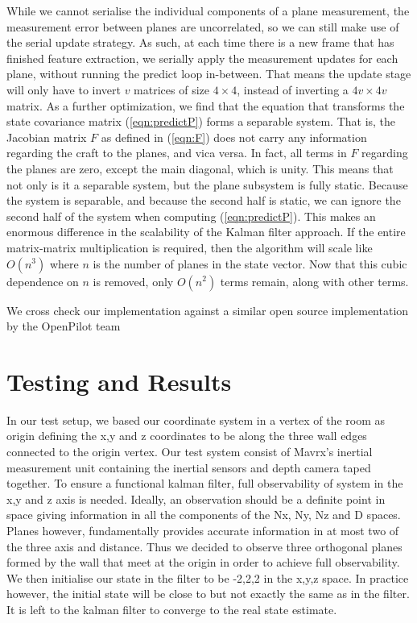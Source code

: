 \documentclass[]{article}
\begin{document}
{While we cannot serialise the individual components of a plane measurement, the measurement error between planes are uncorrelated, so we can still make use of the serial update strategy. As such, at each time there is a new frame that has finished feature extraction, we serially apply the measurement updates for each plane, without running the predict loop in-between.
That means the update stage will only have to invert $v$ matrices of size $4\times4$, instead of inverting a $4v \times 4v$ matrix. 
As a further optimization, we find that the equation that transforms the state covariance matrix (\ref{eqn:predictP}) forms a separable system. That is, the Jacobian matrix $F$ as defined in (\ref{eqn:F}) does not carry any information regarding the craft to the planes, and vica versa.
In fact, all terms in $F$ regarding the planes are zero, except the main diagonal, which is unity. This means that not only is it a separable system, but the plane subsystem is fully static.
Because the system is separable, and because the second half is static, we can ignore the second half of the system when computing (\ref{eqn:predictP}).
This makes an enormous difference in the scalability of the Kalman filter approach. If the entire matrix-matrix multiplication is required, then the algorithm will scale like $O(n^3)$ where $n$ is the number of planes in the state vector. Now that this cubic dependence on $n$ is removed, only $O(n^2)$ terms remain, along with other terms.

	We cross check our implementation against a similar open source implementation by the OpenPilot team %



\section{Testing and Results} %
\label{sub:testing_kalman}
In our test setup, we based our coordinate system in a vertex of the room as origin defining the x,y and z coordinates to be along the three wall edges connected to the origin vertex. Our test system consist of Mavrx's inertial measurement unit containing the inertial sensors and depth camera taped together. To ensure a functional kalman filter, full observability of system in the x,y and z axis is needed. Ideally, an observation should be a definite point in space giving information in all the components of the Nx, Ny, Nz and D spaces. Planes however, fundamentally provides accurate information in at most two of the three axis and distance.  Thus we decided to observe three orthogonal planes formed by the wall that meet at the origin in order to achieve full observability. We then initialise our state in the filter to be -2,2,2 in the x,y,z space. In practice however, the initial state will be close to but not exactly the same as in the filter. It is left to the kalman filter to converge to the real state estimate.

}
\end{document}
